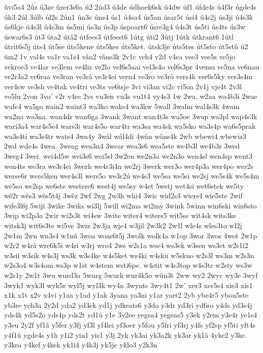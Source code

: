 {ûvi5a4
2ûz
û3ze
ûzer3s6a
ú2
2úd3
ú4de
údhoek6sk
ú4dw
úf1
úfde4s
ú4f3r
úgde4s
úk3
2úl
3úlb
úl2s
2ún1
ún3e
úns4
ús1
ú4sa4
ús5an
úsar5t
úsi4
ú4s2j
ús3ji
ú4s3k
ús6kje
ú4s3l
ú4s3m
ús5mi
ús3n
ús3p
úspoart6
úsre3g4
ú4s3t
ús5ti
ús4ts
ús3w
úswar6s3
út3
úta2
útâ2
útfees3
útfeest6
1útg
úti2
3útj
1útk
útkrant6
1útl
útrit6s5j
úts4
út5se
úts5kene
úts5kes
úts5ket.
útsk3je
úts5tes
út5sto
út5stû
ü2
üm2
1v
val4s
va1r
va1s4
vân2
vâns3k
2v1c
vch4
v2d
v4ea
vee3
vee5s
ve5jo
vekroe3
ve4lar
ve3lem
ve4liz
ve2lo
vel6s5aai
vel3s4o
vel6s3pr
4vemu
ve5na
ve6nau
ve2r3a2
ve6raa
ve3ran
ve3râ
ve3r4ei
vern4
ve3ro
ve3rô
vers4k
ver6s5ky
ver3s4m
ver4sw
ve3sh
ve4tak
ve4tri
ve3ts
ve6tsje
3vi
vi3an
vi2c
vi5oa
2v1j
vje4t
2v3l
vo5lu
2von
3vo'
v2r
v4re
2vs
vu3en
vu3s
vu1t4
vy4s3
1w
2wa.
w2aa
wa4b3i
2wae
wafe4
wa5go
wain2
waint3
wa3ko
waks4
wa3kw
5wall
3walm
wal4s3k
4wam
wa2na
wa3na.
wan4dr
wan6ga
3wank
3want
wan4t3s
wa5oe
3wap
wa3pl
wap4s3k
wari3a4
war4s5e4
wars3i
war4s5o
war4tr
wa3sa
wa4sk
wa5sko
wa3s4p
wa6s5prak
wa3s4ti
wa3s4tr
wats4
3wa4y
3wâl
wâl4di
4wân
wâns4k
2wb
wbewi4
wbewiz3
2wd
wde4s
4wea.
3weag
wea3n4
3wear
wea3s6
wea5ste
we4b3l
we4b3r
3wed
3weg4
3wei.
wei4d5w
wei3s6
wei5sl
3w2en
we2n3a
we2n3o
wen4sl
wen4sp
went3
wen4ts
we3ra
we3r4ei
3werh
we4r3i4n
we2rj
3werk
wer3o
wer4p3a
wer4po
wer2s
werse6r
wers5ken
wer4s3l
wers5o
we3r2ú
we4s3
we5sa
we5si
we2sj
we5s4k
we5s4m
we5so
we2sp
we6ste
westere6
west4j
we5sy
w4et
5wetj
wet4si
wet6stek
we5ty
wê2r
wês3
wês5t4j
3wêz
2wf
2wg
2w3h
whi4
3wic
wid2s3
wiers4
wie5ste
2wif
wife3l6j
5wiji
3wike
3wiks
wi3lj
5will
wi2ma
wi2my
3wink
5winn
win6ski
win6sto
3wip
wi2p3a
2wir
wi2s3t
wi4sw
3wite
witer4
witers5
wit5se
wit4sk
wits3ke
witsk3j
wit6s3te
wi5ve
3wiz
2w3ja
wje4
w3jil
2w3k2
2w1l
wle4s
wles3to
wl2j
2w1m
2wn
wn3s4
w1nú
3woa
woas6t5j
3wolk
wolk4a
w1op
3wor
3wos
4wot
2w1p
w2r2
w4râ
wre6k5i
w4ri
w3rj
wro4
2ws
w2s1a
wse4
ws3ek
w3sen
ws3et
w2s1i2
w3sii
w3sik
w4s3j
ws3k
w3s4ke
w4s5ket
ws4ki
w4sku
w5skuo
w2s3l
ws3m
w2s3n
w2s3o4
w3s4om
ws3p
w1st
w4stem
wsti6pe.
w4stit
w4s3top
w4s3tr
w2sty
ws3w
w2s1y
2w1t
3wu
wurd3a
5wurg
5wurk
wur4k5o
wûn3t
2ww
wy2
2wyc
wy3e
3wyf
3wyk1
wyk3l
wyk5r
wyl5j
wyl3k
wy4n
3wynts
3wy4t1
2w'
xer3
xer5s4
xie3
xis1
x1k
x1t
x2v
x4vi
y1aa
y1ad
y1ak
3yana
ya3ni
y1ar
yart2
2yb
ybe4r5
ybou5ste
yb3re
ych3a
2y2d
yda2
yd3ek
yd1j
ydkeats6
y3do
y3dr
yd3ri
yd6ro
y4ds
yd3s4j
yds4k
yd5s2o
yds4p
yds2t
yd1ú
y1e
3y2ee
yegea4
yegeas5
y3ek
y2em
y3e4r
ye1s4
y3eu
2y2f
yf1â
y5fer
y3fj
yf3l
yf4lei
yf3oer
y5fou
y5fri
yf3rj
y4fs
yf2sp
yf5ti
yft4s
y4f1û
ygde4s
y1h
y1i2
yin1
yis1
y3j
2yk
yk3ai
yk3a2k
yk3ar
yk1â
4yke2
y3ke.
y3kea
y4kef
y4kek
yk1i4
y4k3j
yk5je
yklo3
y2k3n
}

